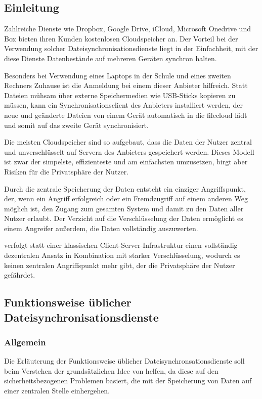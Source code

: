 \subsection{Einleitung}
Zahlreiche Dienste wie Dropbox, Google Drive, iCloud, Microsoft Onedrive und Box
bieten ihren Kunden kostenlosen Cloudspeicher an.
Der Vorteil bei der Verwendung solcher Dateisynchronisationsdienste liegt in der
Einfachheit, mit der diese Dienste Datenbestände auf mehreren Geräten synchron
halten.

Besonders bei Verwendung eines Laptops in der Schule und eines zweiten Rechners
Zuhause ist die Anmeldung bei einem dieser Anbieter hilfreich.
Statt Dateien mühsam über externe Speichermedien wie USB-Sticks kopieren zu
müssen, kann ein Synchronisationsclient des Anbieters installiert werden, der
neue und geänderte Dateien von einem Gerät automatisch in die \gls{filecloud}
lädt und somit auf das zweite Gerät synchronisiert.

Die meisten Cloudspeicher sind so aufgebaut, dass die Daten der Nutzer zentral
und unverschlüsselt auf Servern des Anbieters gespeichert werden.
Dieses Modell ist zwar der simpelste, effizienteste und am einfachsten
umzusetzen, birgt aber Risiken für die Privatsphäre der Nutzer.

Durch die zentrale Speicherung der Daten entsteht ein einziger Angriffspunkt,
der, wenn ein Angriff erfolgreich oder ein Fremdzugriff auf einem anderen Weg
möglich ist, den Zugang zum gesamten System und damit zu den Daten aller Nutzer
erlaubt.
Der Verzicht auf die Verschlüsselung der Daten ermöglicht es einem Angreifer
außerdem, die Daten vollständig auszuwerten.

\sblitg verfolgt statt einer klassischen Client-Server-Infrastruktur einen
vollständig dezentralen Ansatz in Kombination mit starker Verschlüsselung,
wodurch es keinen zentralen Angriffspunkt mehr gibt, der die Privatsphäre der Nutzer gefährdet.

\subsection{Funktionsweise üblicher Dateisynchronisationsdienste}
\subsubsection{Allgemein}
Die Erläuterung der Funktionsweise üblicher Dateisynchronsationsdienste soll beim
Verstehen der grundsätzlichen Idee von \sblit helfen, da diese auf den
sicherheitsbezogenen Problemen basiert, die mit der Speicherung von Daten auf einer
zentralen Stelle einhergehen.

